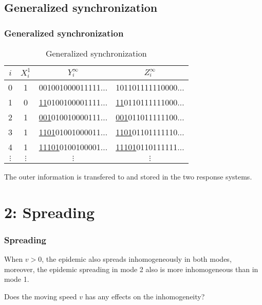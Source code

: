 \documentclass[14pt,handout]{beamer}
\begin{document}
\begin{CJK}{UTF8}{gbsn}
\subsection{Generalized synchronization}
\begin{frame} \frametitle{Generalized synchronization}
\begin{table}[htop]
\centering
\caption[GSync-Table]{Generalized synchronization} \label{tab:gsync}
\begin{tabular}{c|c|c|c}
\hline
$i$ & $X_i^1$ & $Y_i^\infty$ & $Z_i^\infty$ \\
\hline
0 & 1 &             001001000011111$\ldots$ &             101101111110000$\ldots$ \\
1 & 0 & \underline{11}0100100001111$\ldots$ & \underline{11}0110111111000$\ldots$ \\
2 & 1 & \underline{001}010010000111$\ldots$ & \underline{001}011011111100$\ldots$ \\
3 & 1 & \underline{1101}01001000011$\ldots$ & \underline{1101}01101111110$\ldots$ \\
4 & 1 & \underline{11101}0100100001$\ldots$ & \underline{11101}0110111111$\ldots$ \\
$\vdots$ & $\vdots$ & $\vdots$ & $\vdots$\\
\hline\end{tabular}\end{table}
\begin{block}{}
The outer information is transfered to and stored in the two response systems.
\end{block}
\end{frame}

\section{2: Spreading}
\begin{frame} \frametitle{Spreading}
When $v>0$, the epidemic also spreads inhomogeneously in both modes, moreover, the epidemic spreading in mode 2 also is more inhomogeneous than in mode 1.
\begin{block}{}
Does the moving speed $v$ has any effects on the inhomogeneity?
\end{block}
\end{frame}


\end{CJK}
\end{document}
